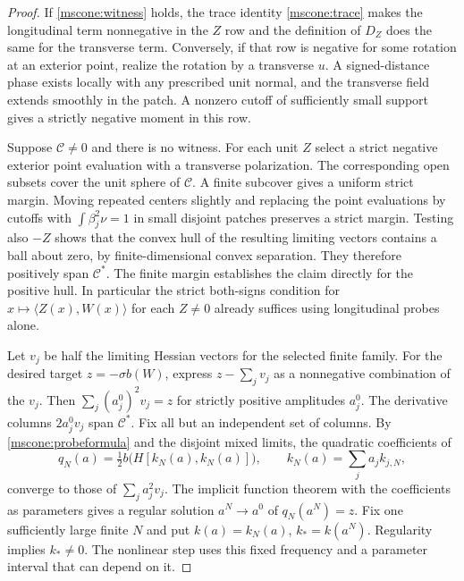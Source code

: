 \documentclass[11pt]{article}
\numberwithin{equation}{section}
\theoremstyle{definition}
\theoremstyle{remark}
\begin{document}
\begin{proof}
If \eqref{mscone:witness} holds, the trace identity
\eqref{mscone:trace} makes the longitudinal term nonnegative in
the \(Z\) row and the definition of \(D_Z\) does the same for the
transverse term. Conversely, if that row is negative for some
rotation at an exterior point, realize the rotation by a transverse
\(u\). A signed-distance phase exists locally with any prescribed
unit normal, and the transverse field extends smoothly in the patch.
A nonzero cutoff of sufficiently small support gives a strictly
negative moment in this row.

Suppose \(\mathcal C\ne0\) and there is no witness. For each unit
\(Z\) select a strict negative exterior point evaluation with a
transverse polarization. The corresponding open subsets cover the
unit sphere of \(\mathcal C\). A finite subcover gives a uniform
strict margin. Moving repeated centers slightly and replacing the
point evaluations by cutoffs with \(\int\beta_j^2\nu=1\) in small
disjoint patches preserves a strict margin. Testing also \(-Z\)
shows that the convex hull of the resulting limiting vectors contains
a ball about zero, by finite-dimensional convex separation.
They therefore positively span \(\mathcal C^*\). The finite
margin establishes the claim directly for the positive hull. In particular the
strict both-signs condition for \(x\mapsto\langle Z(x),W(x)\rangle\)
for each \(Z\ne0\) already suffices using longitudinal probes alone.

Let \(v_j\) be half the limiting Hessian vectors for the selected finite
family. For the desired target \(z=-\sigma b(W)\), express
\(z-\sum_jv_j\) as a nonnegative combination of the \(v_j\).
Then \(\sum_j (a_j^0)^2v_j=z\) for strictly positive amplitudes
\(a_j^0\). The derivative columns \(2a_j^0v_j\) span
\(\mathcal C^*\). Fix all but an independent set of columns.
By \eqref{mscone:probeformula} and the disjoint mixed limits,
the quadratic coefficients of
\[
 q_N(a)=\tfrac12 b\big(H[k_N(a),k_N(a)]\big),
 \qquad k_N(a)=\sum_j a_j k_{j,N},
\]
converge to those of \(\sum_j a_j^2v_j\). The implicit function
theorem with the coefficients as parameters gives a regular
solution \(a^N\to a^0\) of \(q_N(a^N)=z\). Fix one sufficiently
large finite \(N\) and put \(k(a)=k_N(a)\), \(k_*=k(a^N)\).
Regularity implies \(k_*\ne0\). The nonlinear step uses
this fixed frequency and a parameter interval that can depend on it.


\end{proof}
\end{document}
